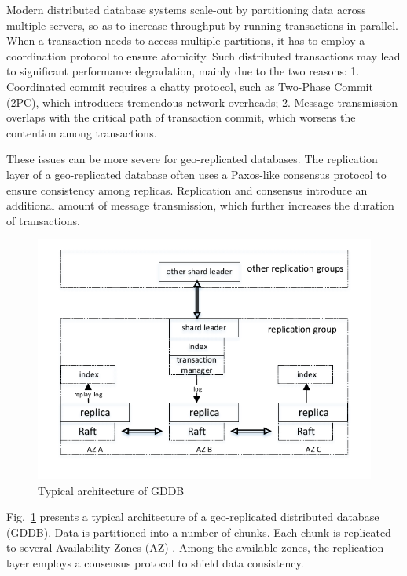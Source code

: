 \documentclass[conference]{IEEEtran}
\begin{document}
Modern distributed database systems scale-out by partitioning data across multiple servers,
so as to increase throughput by running transactions in parallel.
When a transaction needs to access multiple partitions, it has to employ a coordination protocol to ensure atomicity.
Such distributed transactions may lead to significant performance degradation, mainly due to the two reasons\cite{Calvin:conf/sigmod/ThomsonDWRSA12}:
1. Coordinated commit requires a chatty protocol, such as Two-Phase Commit (2PC), which introduces tremendous network overheads;
2. Message transmission overlaps with the critical path of transaction commit, which worsens the contention among transactions.

These issues can be more severe for geo-replicated databases.
The replication layer of a geo-replicated database often uses a Paxos-like consensus protocol to ensure consistency among replicas.
Replication and consensus introduce an additional amount of message transmission, which further increases the duration of transactions.


\begin{figure}[tbp]
  \centerline{\includegraphics[scale=0.7]{figure/architecture.pdf}}
  \caption{Typical architecture of GDDB}
  \label{fig:architecture}
\end{figure}

Fig.~\ref{fig:architecture} presents a typical architecture of a geo-replicated distributed database (GDDB).
Data is partitioned into a number of chunks.
Each chunk is replicated to several Availability Zones (AZ) \cite{Aurora:conf/sigmod/VerbitskiGSCGBM18}.
Among the available zones, the replication layer employs a consensus protocol to shield data consistency.
\end{document}
